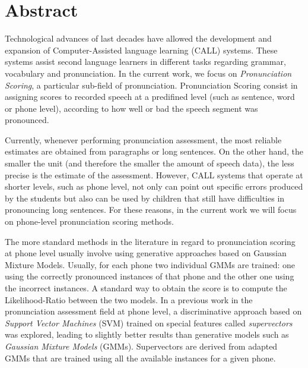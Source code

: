 \chapter*{Abstract}

\noindent
Technological advances of last decades have allowed the development and expansion
of Computer-Assisted language learning (CALL) systems. These systems assist
second language learners in different tasks regarding grammar, vocabulary and
pronunciation. In the current work, we focus on \textit{Pronunciation Scoring},
a particular sub-field of pronunciation. Pronunciation Scoring consist in
assigning scores to recorded speech at a predifined
level (such as sentence, word or phone level), according to how well or bad
the speech segment was pronounced.

Currently, whenever performing pronunciation assessment, the most reliable estimates are
obtained from paragraphs or long sentences. On the other hand, the smaller the unit
(and therefore the smaller the amount of speech data), the less precise is
the estimate of the assessment.
However, CALL systems that operate at shorter levels, such
as phone level,
not only can point out specific errors produced by the students but also
can be used by children that still have difficulties in pronouncing long sentences.
For these reasons,
in the current work we will focus on phone-level pronunciation scoring methods.


The more standard methods in the literature in regard to pronunciation scoring at
phone level usually involve using generative approaches
based on Gaussian Mixture Models.
Usually, for each phone two individual GMMs are trained: one using the correctly
pronounced instances of that phone and the other one using the incorrect instances.
A standard way to obtain the score is to compute the
Likelihood-Ratio between the two models.
In a previous work in the pronunciation assessment field at phone level, a discriminative
approach based on \textit{Support Vector Machines} (SVM) trained on special features
called \textit{supervectors} was explored, leading to slightly better results than
generative models such as \textit{Gaussian Mixture Models} (GMMs). Supervectors
are derived from adapted GMMs that are trained using all the available
instances for a given phone.

